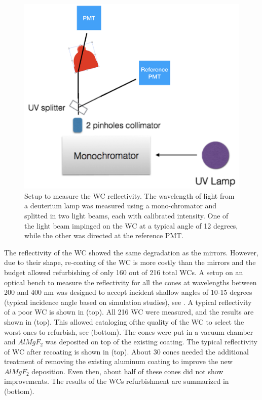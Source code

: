 \begin{figure}
	\centering
	\includegraphics[width=0.95\columnwidth,keepaspectratio]{img/wcSetup.png}
	\caption{Setup to measure the WC reflectivity. The wavelength of light from a deuterium lamp was measured using a mono-chromator and splitted in two
            light beams, each with calibrated intensity. One of the light beam impinged on the WC at a typical angle of 12 degrees,
            while the other was directed at the reference PMT. }
	\label{fig:wcSetup}
\end{figure}

The reflectivity of the WC showed the same degradation as the mirrors. However, due to their shape, re-coating of the WC is more costly than the mirrors and the budget allowed
refurbishing of only 160 out of 216 total WCs.
A setup on an optical bench to measure the reflectivity for all the cones at wavelengths between 200 and 400 nm was designed to accept incident
shallow angles of 10-15 degrees (typical incidence angle based on simulation studies), see . A typical reflectivity of a poor WC is shown in  (top).
All 216 WC were measured, and the results are shown in  (top). This allowed cataloging ofthe quality of the WC to select the worst ones to refurbish,
see  (bottom).
The cones were put in a vacuum chamber and $AlMgF_2$ was deposited on top of the existing coating. The typical reflectivity of WC after recoating is shown in  (top).
About 30 cones needed the additional treatment of removing the existing aluminum coating to improve the new $AlMgF_2$ deposition. Even then, about half of these cones did not show improvements.
The results of the WCs refurbishment are summarized in  (bottom).


